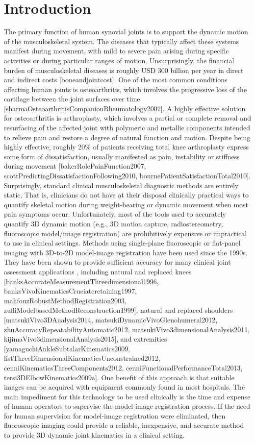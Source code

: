 \chapter{Introduction}

The primary function of human synovial joints is to support the dynamic motion of the musculoskeletal system. The diseases that typically affect these systems manifest during movement, with mild to severe pain arising during specific activities or during particular ranges of motion. Unsurprisingly, the financial burden of musculoskeletal diseases is roughly USD 300 billion per year in direct and indirect costs [boneandjointcost]. One of the most common conditions affecting human joints is osteoarthritis, which involves the progressive loss of the cartilage between the joint surfaces over time [sharmaOsteoarthritisCompanionRheumatology2007]. A highly effective solution for osteoarthritis is arthroplasty, which involves a partial or complete removal and resurfacing of the affected joint with polymeric and metallic components intended to relieve pain and restore a degree of natural function and motion. Despite being highly effective, roughly 20\% of patients receiving total knee arthroplasty express some form of dissatisfaction, usually manifested as pain, instability or stiffness during movement [bakerRolePainFunction2007, scottPredictingDissatisfactionFollowing2010, bournePatientSatisfactionTotal2010]. Surprisingly, standard clinical musculoskeletal diagnostic methods are entirely static. That is, clinicians do not have at their disposal clinically practical ways to quantify skeletal motion during weight-bearing or dynamic movement when most pain symptoms occur. Unfortunately, most of the tools used to accurately quantify 3D dynamic motion (e.g., 3D motion capture, radiostereometry, fluoroscopic model/image registration) are prohibitively expensive or impractical to use in clinical settings. Methods using single-plane fluoroscopic or flat-panel imaging with 3D-to-2D model-image registration have been used since the 1990s. They have been shown to provide sufficient accuracy for many clinical  joint assessment applications , including natural and replaced knees [banksAccurateMeasurementThreedimensional1996, banksVivoKinematicsCruciateretaining1997, mahfouzRobustMethodRegistration2003, zuffiModelbasedMethodReconstruction1999], natural and replaced shoulders [matsukiVivo3DAnalysis2014, matsukiDynamicVivoGlenohumeral2012, zhuAccuracyRepeatabilityAutomatic2012, matsukiVivo3dimensionalAnalysis2011, kijimaVivo3dimensionalAnalysis2015], and extremities [yamaguchiAnkleSubtalarKinematics2009, listThreeDimensionalKinematicsUnconstrained2012, cenniKinematicsThreeComponents2012, cenniFunctionalPerformanceTotal2013, tersi3DElbowKinematics2009a]. One benefit of this approach is that suitable images can be acquired with equipment commonly found in most hospitals. The main impediment for this technology to be used clinically is the time and expense of human operators to supervise the model-image registration process. If the need for human supervision for model-image registration were eliminated, then fluoroscopic imaging could provide a reliable, inexpensive, and accurate method to provide 3D dynamic joint kinematics in a clinical setting.
